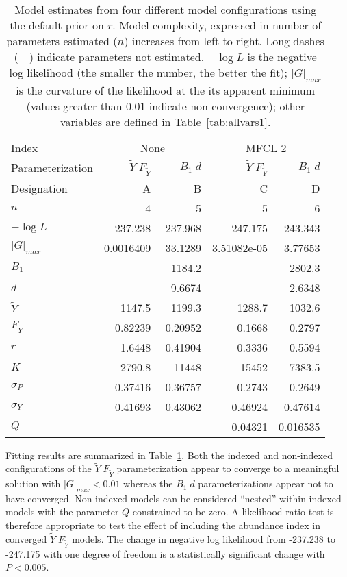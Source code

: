 \documentclass[12pt,letterpaper,twoside]{article}
\newcommand\MSY{\widetilde{Y}}
\newcommand\Fmsy{F_{\MSY}}
\newcommand\MSYFmsy{\MSY\;\Fmsy}
\newcommand\Bd{B_1\; d}
\begin{document}
\begin{table}
\caption{
Model estimates from four different model configurations using the
default prior on $r$.
Model complexity, expressed in number of parameters estimated ($n$)
increases from left to right. Long dashes (---) indicate parameters
not estimated. 
{%
$-\log L$ is the negative log likelihood (the smaller the number, the
better the fit);
$|G|_{max}$ is the curvature of the likelihood at the its apparent
minimum (values greater than $0.01$ indicate non-convergence);
other variables are defined in Table~\ref{tab:allvars1}.
}
\label{tag:ests4}}
\begin{center}
\begin{tabular}{|l|rr|rr|}
\hline
Index & \multicolumn{2}{c|}{None}&\multicolumn{2}{c|}{MFCL 2}\\
\cline{2-3}\cline{4-5}
Parameterization&$\MSYFmsy$&$\Bd$&$\MSYFmsy$&$\Bd$\\
Designation& A & B& C& D\\
\hline
\hline
$n$ & 4 & 5 & 5 & 6\\
$-\log L$ & -237.238 & -237.968 & -247.175 & -243.343\\
$|G|_{max}$ & 0.0016409 & 33.1289 & 3.51082e-05 & 3.77653\\
\hline
$B_1$ & --- & 1184.2 & --- & 2802.3\\
$d$ & --- & 9.6674 & --- & 2.6348\\
$\MSY$ & 1147.5 & 1199.3 & 1288.7 & 1032.6\\
$\Fmsy$ & 0.82239 & 0.20952 & 0.1668 & 0.2797\\
$r$ & 1.6448 & 0.41904 & 0.3336 & 0.5594\\
$K$ & 2790.8 & 11448 & 15452 & 7383.5\\
$\sigma_P$ & 0.37416 & 0.36757 & 0.2743 & 0.2649\\
$\sigma_Y$ & 0.41693 & 0.43062 & 0.46924 & 0.47614\\
$Q$ & --- & --- & 0.04321 & 0.016535\\
\hline
\end{tabular}
\end{center}
\end{table}

Fitting results are summarized in Table~\ref{tag:ests4}.
Both the indexed and non-indexed configurations of the $\MSYFmsy$
parameterization
appear to converge to a meaningful solution with $|G|_{max}<0.01$
whereas the  $\Bd$ parameterizations appear not to have converged. 
Non-indexed models can be considered ``nested'' within indexed
models with the parameter $Q$ constrained to be zero. A likelihood
ratio test is therefore appropriate to test the effect of including
the abundance index in converged $\MSYFmsy$ models. 
The change in negative log likelihood
from -237.238 to -247.175 with one degree of freedom is a statistically
significant change with $P<0.005$.
\end{document}
